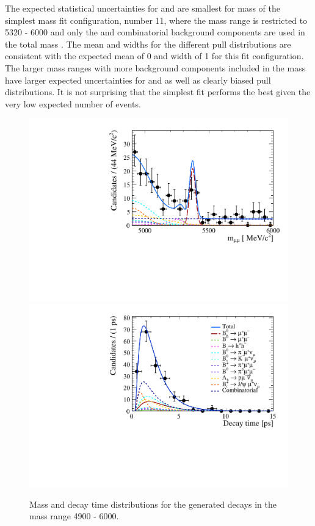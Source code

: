 {The expected statistical uncertainties for \tmumu and \Gmumu are smallest for mass of the simplest mass fit configuration, number 11, where the mass range is restricted to 5320 - 6000 \mevcc and only the \bsmumu and combinatorial background components are used in the total mass \pdf. The mean and widths for the different pull distributions are consistent with the expected mean of 0 and width of 1 for this fit configuration. The larger mass ranges with more background components included in the mass \pdf have larger expected uncertainties for \tmumu and \Gmumu as well as clearly biased pull distributions. It is not surprising that the simplest fit performs the best given the very low expected number of events. 

\begin{figure}[hp]
    \centering
        \includegraphics[width= 0.7 \textwidth]{./Figs/LifetimeMeasurement/generated_mass.pdf}
        \includegraphics[width= 0.7 \textwidth]{./Figs/LifetimeMeasurement/generated_DT.pdf}
 
    \caption{Mass and decay time distributions for the generated decays in the mass range 4900 - 6000.}
    \label{fig:toygen}
\end{figure}

}
